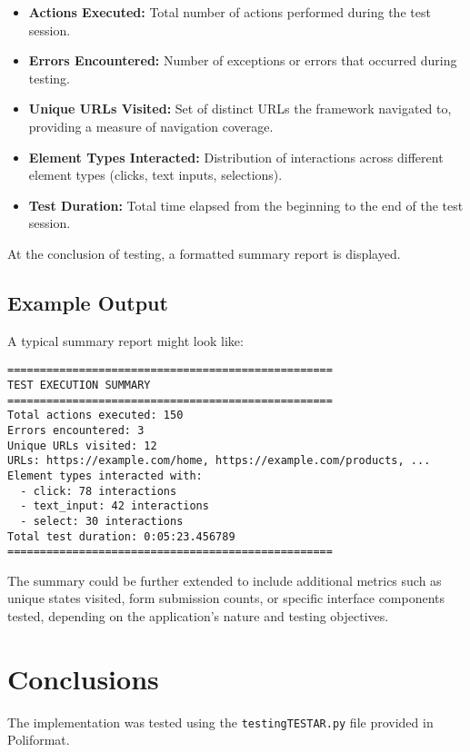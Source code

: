 \begin{itemize}
    \item \textbf{Actions Executed:} Total number of actions performed during the test session.
    \item \textbf{Errors Encountered:} Number of exceptions or errors that occurred during testing.
    \item \textbf{Unique URLs Visited:} Set of distinct URLs the framework navigated to, providing a measure of navigation coverage.
    \item \textbf{Element Types Interacted:} Distribution of interactions across different element types (clicks, text inputs, selections).
    \item \textbf{Test Duration:} Total time elapsed from the beginning to the end of the test session.
\end{itemize}


At the conclusion of testing, a formatted summary report is displayed.


\subsection{Example Output}

A typical summary report might look like:

\begin{verbatim}
==================================================
TEST EXECUTION SUMMARY
==================================================
Total actions executed: 150
Errors encountered: 3
Unique URLs visited: 12
URLs: https://example.com/home, https://example.com/products, ...
Element types interacted with:
  - click: 78 interactions
  - text_input: 42 interactions
  - select: 30 interactions
Total test duration: 0:05:23.456789
==================================================
\end{verbatim}



The summary could be further extended to include additional metrics such as unique states visited, form submission counts, or specific interface components tested, depending on the application's nature and testing objectives.

\section{Conclusions}

The implementation was tested using the \texttt{testingTESTAR.py} file provided in Poliformat.

